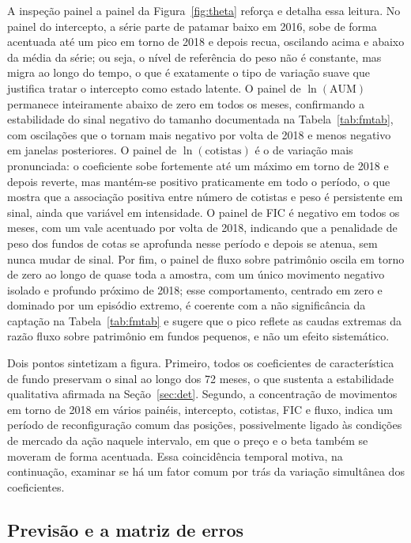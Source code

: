 \documentclass[12pt,a4paper]{article}
\begin{document}
A inspeção painel a painel da Figura~\ref{fig:theta} reforça e detalha essa leitura. No painel do
intercepto, a série parte de patamar baixo em 2016, sobe de forma acentuada até um pico em torno
de 2018 e depois recua, oscilando acima e abaixo da média da série; ou seja, o nível de referência
do peso não é constante, mas migra ao longo do tempo, o que é exatamente o tipo de variação suave
que justifica tratar o intercepto como estado latente. O painel de $\ln(\text{AUM})$ permanece
inteiramente abaixo de zero em todos os meses, confirmando a estabilidade do sinal negativo do
tamanho documentada na Tabela~\ref{tab:fmtab}, com oscilações que o tornam mais negativo por volta
de 2018 e menos negativo em janelas posteriores. O painel de $\ln(\text{cotistas})$ é o de
variação mais pronunciada: o coeficiente sobe fortemente até um máximo em torno de 2018 e depois
reverte, mas mantém-se positivo praticamente em todo o período, o que mostra que a associação
positiva entre número de cotistas e peso é persistente em sinal, ainda que variável em
intensidade. O painel de FIC é negativo em todos os meses, com um vale acentuado por volta de
2018, indicando que a penalidade de peso dos fundos de cotas se aprofunda nesse período e depois
se atenua, sem nunca mudar de sinal. Por fim, o painel de fluxo sobre patrimônio oscila em torno
de zero ao longo de quase toda a amostra, com um único movimento negativo isolado e profundo
próximo de 2018; esse comportamento, centrado em zero e dominado por um episódio extremo, é
coerente com a não significância da captação na Tabela~\ref{tab:fmtab} e sugere que o pico reflete
as caudas extremas da razão fluxo sobre patrimônio em fundos pequenos, e não um efeito
sistemático.

Dois pontos sintetizam a figura. Primeiro, todos os coeficientes de característica de fundo
preservam o sinal ao longo dos 72 meses, o que sustenta a estabilidade qualitativa afirmada na
Seção~\ref{sec:det}. Segundo, a concentração de movimentos em torno de 2018 em vários painéis,
intercepto, cotistas, FIC e fluxo, indica um período de reconfiguração comum das posições,
possivelmente ligado às condições de mercado da ação naquele intervalo, em que o preço e o beta
também se moveram de forma acentuada. Essa coincidência temporal motiva, na continuação, examinar
se há um fator comum por trás da variação simultânea dos coeficientes.

\subsection{Previsão e a matriz de erros}
\end{document}
